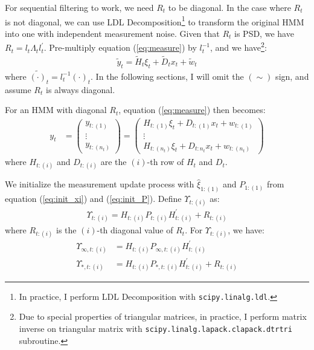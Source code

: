 \documentclass[10pt]{article}
\numberwithin{equation}{section}
\begin{document}
For sequential filtering to work, we need $R_t$ to be diagonal. In the case where $R_t$ is not diagonal, we can use LDL Decomposition\footnote{In practice, I perform LDL Decomposition with \texttt{scipy.linalg.ldl}.} to transform the original HMM into one with independent measurement noise. Given that $R_t$ is PSD, we have $R_t = l_t\Lambda_tl_t^{'}$. Pre-multiply equation (\ref{eq:measure}) by $l_t^{-1}$, and we have\footnote{Due to special properties of triangular matrices, in practice, I perform matrix inverse on triangular matrix with \texttt{scipy.linalg.lapack.clapack.dtrtri} subroutine.}:
\begin{align}
    \tilde{y}_t = \tilde{H}_t\xi_{t} + \tilde{D}_{t}x_t + \tilde{w}_t \label{eq:ldl}
\end{align}
where $\tilde{(\cdot)}_t = l_t^{-1}(\cdot)_t$. In the following sections, I will omit the $(\sim)$ sign, and assume $R_t$ is always diagonal.

For an HMM with diagonal $R_t$, equation (\ref{eq:measure}) then becomes:
\begin{align*}
    y_t &= 
    \begin{pmatrix}
        y_{t:(1)} \\
        \vdots \\ 
        y_{t:(n_t)}
    \end{pmatrix} 
    = \begin{pmatrix}
        H_{t:(1)}\xi_t + D_{t:(1)}x_t + w_{t:(1)} \\
        \vdots \\
        H_{t:(n_t)}\xi_t + D_{t:n_t}x_t + w_{t:(n_t)}
    \end{pmatrix}
\end{align*}
where $H_{t:(i)}$ and $D_{t:(i)}$ are the $(i)$-th row of $H_t$ and $D_t$. 

We initialize the measurement update process with $\hat{\xi}_{1:(1)}$ and $P_{1:(1)}$ from equation (\ref{eq:init_xi}) and (\ref{eq:init_P}). Define $\Upsilon_{t:(i)}$ as:
\begin{align*}
    \Upsilon_{t:(i)} = H_{t:(i)}P_{t:(i)}H_{t:(i)}^{'} + R_{t:(i)}
\end{align*}
where $R_{t:(i)}$ is the $(i)$-th diagonal value of $R_{t}$. For $\Upsilon_{t:(i)}$, we have:
\begin{align*}
    \Upsilon_{\infty, t:(i)} &= H_{t:(i)}P_{\infty, t:(i)}H_{t:(i)}^{'} \\
    \Upsilon_{*,t:(i)} &= H_{t:(i)}P_{*,t:(i)}H_{t:(i)}^{'} + R_{t:(i)}
\end{align*}
\end{document}
